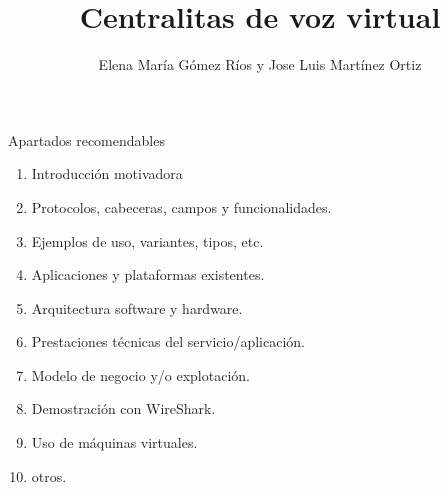 \documentclass[11pt]{beamer}
\author{Elena María Gómez Ríos y Jose Luis Martínez Ortiz}
\title{Centralitas de voz virtual} %
\begin{document}
\begin{frame}
\titlepage
\end{frame}


\begin{frame}{Apartados recomendables}
\begin{enumerate}
\item Introducción motivadora
\item Protocolos, cabeceras, campos y funcionalidades.
\item Ejemplos de uso, variantes, tipos, etc.
\item Aplicaciones y plataformas existentes.
\item Arquitectura software y hardware.
\item Prestaciones técnicas del servicio/aplicación.
\item Modelo de negocio y/o explotación.
\item Demostración con WireShark.
\item Uso de máquinas virtuales.
\item otros.
\end{enumerate}
\end{frame}
\end{document}
